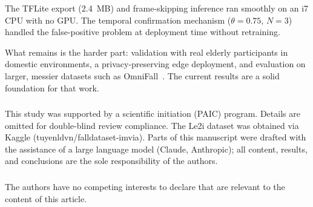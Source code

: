 \documentclass[runningheads]{llncs}
\begin{document}
The TFLite export (2.4~MB) and frame-skipping inference ran smoothly on an i7 CPU with no GPU. The temporal confirmation mechanism ($\theta = 0.75$, $N = 3$) handled the false-positive problem at deployment time without retraining.

What remains is the harder part: validation with real elderly participants in domestic environments, a privacy-preserving edge deployment, and evaluation on larger, messier datasets such as OmniFall~\cite{sigurdsson2025}. The current results are a solid foundation for that work.

\begin{credits}
\subsubsection{\ackname}
This study was supported by a scientific initiation (PAIC) program. Details are omitted for double-blind review compliance. The Le2i dataset was obtained via Kaggle (tuyenldvn/falldataset-imvia). Parts of this manuscript were drafted with the assistance of a large language model (Claude, Anthropic); all content, results, and conclusions are the sole responsibility of the authors.

\subsubsection{\discintname}
The authors have no competing interests to declare that are relevant to the content of this article.
\end{credits}
%
%
% 
% 
%
\end{document}
